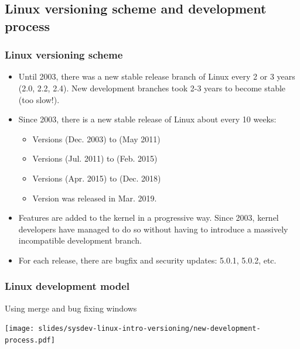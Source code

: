 \subsection{Linux versioning scheme and development process}

\begin{frame}
  \frametitle{Linux versioning scheme}
  \begin{itemize}
  \item Until 2003, there was a new stable release branch of Linux every
        2 or 3 years (2.0, 2.2, 2.4). New development branches took 2-3
        years to become stable (too slow!).
  \item Since 2003, there is a new stable release of Linux about every
	10 weeks:
  \begin{itemize}
	\item Versions  (Dec. 2003) to  (May 2011)
	\item Versions  (Jul. 2011) to  (Feb. 2015)
	\item Versions  (Apr. 2015) to  (Dec. 2018)
	\item Version  was released in Mar. 2019.
  \end{itemize}
  \item Features are added to the kernel in a progressive way. Since
        2003, kernel developers have managed to do so without having
        to introduce a massively incompatible development branch.
  \item For each release, there are bugfix and security updates:
    5.0.1, 5.0.2, etc.
  \end{itemize}
\end{frame}

\begin{frame}
  \frametitle{Linux development model}
  Using merge and bug fixing windows
  \begin{center}
    \texttt{[image: slides/sysdev-linux-intro-versioning/new-development-process.pdf]}
  \end{center}
\end{frame}

